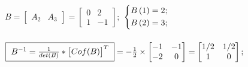 \documentclass{article}
\begin{document}
\begin{preview}
                \paragraph{}
                \begin{math}
                        B = \begin{bmatrix}
                                A_2 & A_3
                        \end{bmatrix}
                        = \begin{bmatrix}
                                0 & 2 \\
                                1 & -1
                        \end{bmatrix};
                \end{math}
                \quad
                \begin{math}
                        \begin{dcases}
                                \begin{aligned}
                                        B\left(1\right) & = 2; \\
                                        B\left(2\right) & = 3;
                                \end{aligned}
                        \end{dcases}
                \end{math}

                \paragraph{}
                \begin{math}
                        \framebox{
                                $
                                B^{-1} = \frac{1}{det(B)} *
                                \begin{bmatrix}
                                        Cof(B)
                                \end{bmatrix}^T
                                $
                        } =
                        - \frac{1}{2} \times \begin{bmatrix}
                                -1 & -1 \\
                                -2 & 0
                        \end{bmatrix} =
                        \begin{bmatrix}
                                1/2 & 1/2 \\
                                1 & 0
                        \end{bmatrix};
                \end{math}



\end{preview}
\end{document}
